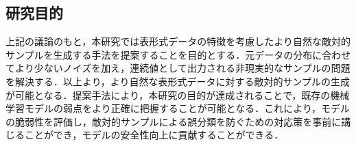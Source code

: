 \subsection{研究目的}
上記の議論のもと，本研究では表形式データの特徴を考慮したより自然な敵対的サンプルを生成する手法を提案することを目的とする．元データの分布に合わせてより少ないノイズを加え，連続値として出力される非現実的なサンプルの問題を解決する．以上より，より自然な表形式データに対する敵対的サンプルの生成が可能となる．提案手法により，本研究の目的が達成されることで，既存の機械学習モデルの弱点をより正確に把握することが可能となる．これにより，モデルの脆弱性を評価し，敵対的サンプルによる誤分類を防ぐための対応策を事前に講じることができ，モデルの安全性向上に貢献することができる．